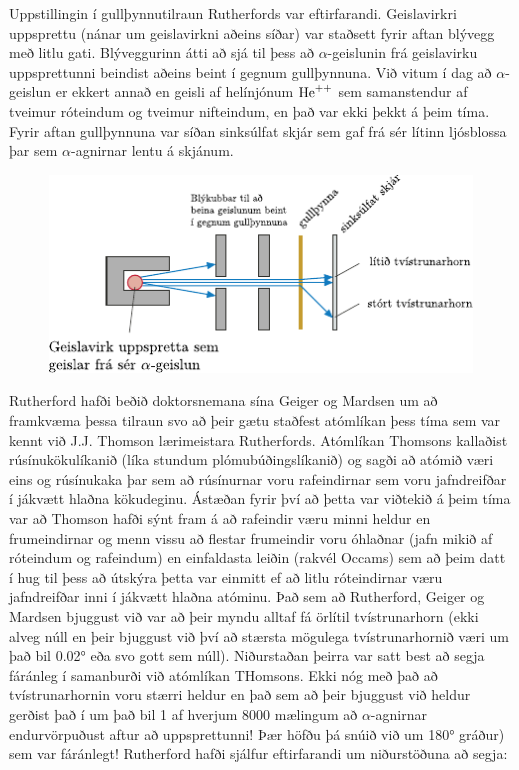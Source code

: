 Uppstillingin í gullþynnutilraun Rutherfords var eftirfarandi. Geislavirkri uppsprettu (nánar um geislavirkni aðeins síðar) var staðsett fyrir aftan blývegg með litlu gati. Blýveggurinn átti að sjá til þess að $\alpha$-geislunin frá geislavirku uppsprettunni beindist aðeins beint í gegnum gullþynnuna. Við vitum í dag að $\alpha$-geislun er ekkert annað en geisli af helínjónum $\ce{He^++}$ sem samanstendur af tveimur róteindum og tveimur nifteindum, en það var ekki þekkt á þeim tíma. Fyrir aftan gullþynnuna var síðan sinksúlfat skjár sem gaf frá sér lítinn ljósblossa þar sem $\alpha$-agnirnar lentu á skjánum.

\begin{figure}[H]
    \centering
    \includegraphics{figures/rutherford-gold.pdf}
\end{figure}

Rutherford hafði beðið doktorsnemana sína Geiger og Mardsen um að framkvæma þessa tilraun svo að þeir gætu staðfest atómlíkan þess tíma sem var kennt við J.J. Thomson lærimeistara Rutherfords. Atómlíkan Thomsons kallaðist rúsínukökulíkanið (líka stundum plómubúðingslíkanið) og sagði að atómið væri eins og rúsínukaka þar sem að rúsínurnar voru rafeindirnar sem voru jafndreifðar í jákvætt hlaðna kökudeginu. Ástæðan fyrir því að þetta var viðtekið á þeim tíma var að Thomson hafði sýnt fram á að rafeindir væru minni heldur en frumeindirnar og menn vissu að flestar frumeindir voru óhlaðnar (jafn mikið af róteindum og rafeindum) en einfaldasta leiðin (rakvél Occams) sem að þeim datt í hug til þess að útskýra þetta var einmitt ef að litlu róteindirnar væru jafndreifðar inni í jákvætt hlaðna atóminu. Það sem að Rutherford, Geiger og Mardsen bjuggust við var að þeir myndu alltaf fá örlítil tvístrunarhorn (ekki alveg núll en þeir bjuggust við því að stærsta mögulega tvístrunarhornið væri um það bil \ang{0.02} eða svo gott sem núll). Niðurstaðan þeirra var satt best að segja fáránleg í samanburði við atómlíkan THomsons. Ekki nóg með það að tvístrunarhornin voru stærri heldur en það sem að þeir bjuggust við heldur gerðist það í um það bil 1 af hverjum 8000 mælingum að $\alpha$-agnirnar endurvörpuðust aftur að uppsprettunni! Þær höfðu þá snúið við um \ang{180} gráður) sem var fáránlegt! Rutherford hafði sjálfur eftirfarandi um niðurstöðuna að segja:


